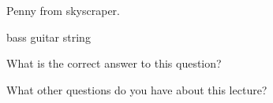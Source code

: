 \documentclass{ximera}
\begin{document}
Penny from skyscraper. 


bass guitar string


\begin{question}
  What is the correct answer to this question?

  \begin{solution}
    \begin{multiple-choice}
    \end{multiple-choice}  
  \end{solution}
\end{question}

What other questions do you have about this lecture?
\begin{free-response}
\end{free-response}
\end{document}

